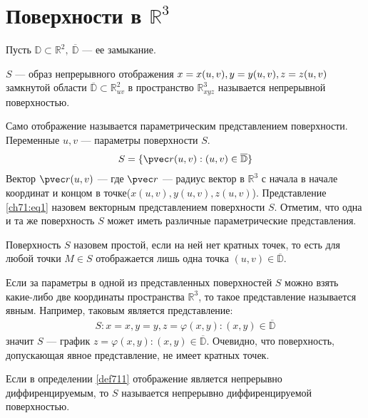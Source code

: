 \section{Поверхности в $\mathbb{R}^3$}
Пусть $\mathbb{D} \subset \mathbb{R}^2, \ \overline{\mathbb{D}}$ --- ее
замыкание.

\begin{definition}
  \label{def711}
  $S$ --- образ непрерывного отображения $x = x(u, v), y = y(u, v), \\ z = z(u,
  v)$ замкнутой области $\overline{\mathbb{D}} \subset \mathbb{R}_{uv}^2$ в
  пространство $\mathbb{R}_{xyz}^3$ называется непрерывной поверхностью.
\end{definition}
Само отображение называется параметрическим представлением поверхности.
Переменные $u, v$ --- параметры поверхности $S$.
\begin{gather}
  S = \{\pvec r(u, v) : (u, v) \in \overline{\mathbb{D}} \}
  \label{ch71:eq1}
\end{gather}
Вектор $\pvec r(u, v)$ --- где $\pvec r$ --- радиус вектор в $\mathbb{R}^3$ с
начала в начале координат и концом в точке($x(u, v), y(u, v), z(u, v)$).
Представление \eqref{ch71:eq1} назовем векторным представлением поверхности
$S$. Отметим, что одна и та же поверхность $S$ может иметь различные
параметрические представления.

\begin{definition}
  Поверхность $S$ назовем простой, если на ней нет кратных точек, то есть для
  любой точки $M \in S$ отображается лишь одна точка $(u,v) \in
  \overline{\mathbb{D}}$.
\end{definition}

\begin{definition}
  Если за параметры в одной из представленных поверхностей $S$ можно взять
  какие-либо две координаты пространства $\mathbb{R}^3$, то такое представление
  называется явным. Например, таковым является представление:
  \begin{gather*}
    S : x = x, y = y, z = \varphi(x, y) : (x, y) \in \overline{\mathbb{D}}
  \end{gather*}
  значит $S$ --- график $z = \varphi(x, y): (x, y) \in \overline{\mathbb{D}}$.
  Очевидно, что поверхность, допускающая явное представление, не имеет кратных
  точек.
\end{definition}

\begin{definition}
  Если в определении \eqref{def711} отображение является непрерывно
  диффиренцируемым, то $S$ называется непрерывно диффиренцируемой поверхностью.
\end{definition}

